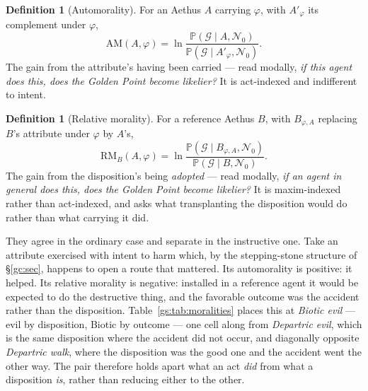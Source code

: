 \documentclass[11pt]{article}
\numberwithin{equation}{section}
\theoremstyle{plain}
\theoremstyle{definition}
\newtheorem{definition}[theorem]{Definition}
\theoremstyle{remark}
\newcommand{\PP}{\mathbb{P}}
\begin{document}
\begin{definition}[Automorality]\label{gs:def:automorality}
For an Aethus $A$ carrying $\varphi$, with $A'_\varphi$ its complement
under $\varphi$,
\begin{equation}\label{gs:eq:am}
\mathrm{AM}(A,\varphi)=
\ln\frac{\PP(\mathcal G\mid A,\mathcal N_0)}
{\PP(\mathcal G\mid A'_\varphi,\mathcal N_0)} .
\end{equation}
The gain from the attribute's having been carried --- read modally,
\emph{if this agent does this, does the Golden Point become likelier?}
It is act-indexed and indifferent to intent.
\end{definition}

\begin{definition}[Relative morality]\label{gs:def:relmorality}
For a reference Aethus $B$, with $B_{\varphi,A}$ replacing $B$'s
attribute under $\varphi$ by $A$'s,
\begin{equation}\label{gs:eq:rm}
\mathrm{RM}_B(A,\varphi)=
\ln\frac{\PP(\mathcal G\mid B_{\varphi,A},\mathcal N_0)}
{\PP(\mathcal G\mid B,\mathcal N_0)} .
\end{equation}
The gain from the disposition's being \emph{adopted} --- read modally,
\emph{if an agent in general does this, does the Golden Point become
likelier?} It is maxim-indexed rather than act-indexed, and asks what
transplanting the disposition would do rather than what carrying it did.
\end{definition}

They agree in the ordinary case and separate in the instructive one. Take
an attribute exercised with intent to harm which, by the stepping-stone
structure of \S\ref{gc:sec}, happens to open a route that mattered. Its
automorality is positive: it helped. Its relative morality is negative:
installed in a reference agent it would be expected to do the destructive
thing, and the favorable outcome was the accident rather than the
disposition. Table~\ref{gs:tab:moralities} places this at \emph{Biotic evil} --- evil
by disposition, Biotic by outcome --- one cell along from \emph{Departric
evil}, which is the same disposition where the accident did not occur,
and diagonally opposite \emph{Departric walk}, where the disposition was
the good one and the accident went the other way. The pair therefore holds apart what an act \emph{did} from
what a disposition \emph{is}, rather than reducing either to the other.
\end{document}
